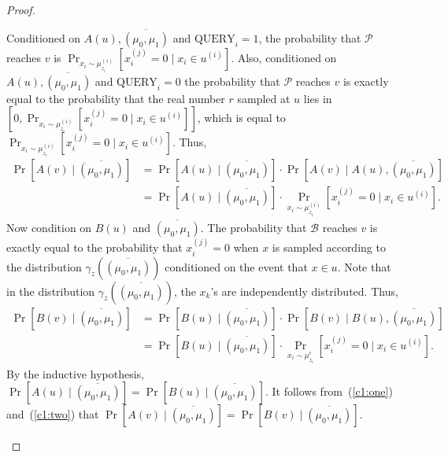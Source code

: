 \documentclass{toc}
\newcommand{\q}{\text{QUERY}}
\newcommand{\clB}{\mathcal{B}}
\newcommand{\clP}{\mathcal{P}}
\begin{document}
\begin{proof}
\begin{description}
\begin{itemize}
Conditioned on $A(u), \overline{(\mu_0,\mu_1)}$ and $\q_i=1$, the probability that $\clP$ reaches $v$ is $\Pr_{x_i \sim \mu_{z_i}^{(i)}}[x_i^{(j)}=0 \mid x_i \in u^{(i)}]$. Also, conditioned on $A(u),\overline{(\mu_0,\mu_1)}$ and 
$\q_i=0$ the probability that $\clP$ reaches $v$ is exactly equal to the probability that the real number $r$ sampled at $u$ lies in $[0, \Pr_{x_i \sim \mu_{z_i}^{(i)}}[x_i^{(j)}=0 \mid x_i \in u^{(i)}] ]$, which is equal to 
$\Pr_{x_i \sim \mu_{z_i}^{(i)}}[x_i^{(j)}=0 \mid x_i \in u^{(i)}]$. Thus,
\begin{align}
\Pr[A(v) \mid \overline{(\mu_0,\mu_1)}]&=\Pr[A(u) \mid \overline{(\mu_0,\mu_1)}] \cdot \Pr[A(v) \mid A(u), \overline{(\mu_0,\mu_1)}] \nonumber \\
&=\Pr[A(u) \mid \overline{(\mu_0,\mu_1)}] \cdot \Pr_{x_i \sim \mu_{z_i}^{(i)}}[x_i^{(j)}=0 \mid x_i \in u^{(i)}]. \label{c1:one}
\end{align}
Now condition on $B(u)$ and $\overline{(\mu_0,\mu_1)}$. The probability that $\clB$ reaches $v$ is exactly equal to the probability that $x_i^{(j)}=0$ when $x$ is sampled according to the distribution 
$\gamma_z(\overline{(\mu_0,\mu_1)})$ conditioned on the event that $x \in u$. Note that in the distribution $\gamma_z(\overline{(\mu_0,\mu_1)})$, the $x_k$'s are independently distributed. Thus,
\begin{align}
\Pr[B(v) \mid \overline{(\mu_0,\mu_1)}]&=\Pr[B(u) \mid \overline{(\mu_0,\mu_1)}] \cdot \Pr[B(v) \mid B(u),\overline{(\mu_0,\mu_1)}] \nonumber \\
&=\Pr[B(u) \mid \overline{(\mu_0,\mu_1)}] \cdot \Pr_{x_i \sim \mu_{z_i}^i}[x_i^{(j)}=0 \mid x_i \in u^{(i)}]. \label{c1:two}
\end{align}
By the inductive hypothesis, $\Pr[A(u) \mid \overline{(\mu_0,\mu_1)}]=\Pr[B(u) \mid \overline{(\mu_0,\mu_1)}]$. It follows from~(\ref{c1:one}) and~(\ref{c1:two}) that 
$\Pr[A(v) \mid \overline{(\mu_0,\mu_1)}]=\Pr[B(v) \mid \overline{(\mu_0,\mu_1)}]$.


\end{itemize}
\end{description}
\end{proof}
\end{document}
